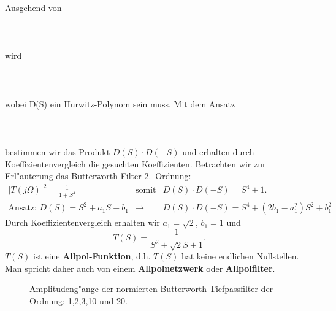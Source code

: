 \subsubsection{}
Ausgehend von\\~~\\
\\~~\\
wird\\~~\\
\\~~\\
\nit wobei D(S) ein Hurwitz-Polynom sein muss.  Mit dem Ansatz\\~~\\
\\~~\\
\nit bestimmen wir das Produkt $D(S) \cdot D(-S)$ und erhalten durch
Koeffizientenvergleich die gesuchten Koeffizienten. Betrachten wir
zur Erl"auterung das Butterworth-Filter 2.~Ordnung:
\begin{eqnarray*}
 |T(j\Omega)|^{2}=\frac{1}{1+S^{4}}&\mbox{somit ist} & D(S) \cdot D(-S)=S^{4}+1.\\
\mbox{Ansatz: } D(S)=S^{2}+a_{1}S+b_{1}  & \longrightarrow & D(S) \cdot D(-S)=S^{4}+(2b_{1}-a_{1}^{2})S^{2}+b_{1}^{2}
\end{eqnarray*}
Durch Koeffizientenvergleich erhalten wir $a_{1}=\sqrt{2}$, $b_{1}=1$
und
\[
T(S)=\frac{1}{S^{2}+\sqrt{2}S+1}.
\]
$T(S)$ ist eine {\bf Allpol-Funktion}, d.h. $T(S)$ hat keine endlichen
Nullstellen. Man spricht daher auch von einem {\bf Allpolnetzwerk}
oder {\bf Allpolfilter}.


\begin{figure}[!htb]%
\vspace*{-3mm} %
\begin{center}
\vspace*{-2mm}\caption{Amplitudeng"ange der normierten Butterworth-Tiefpassfilter der Ordnung: 1,2,3,10 und 20.}\label{fig_fil_butterworth}
\end{center}
\vspace*{-6mm}
\end{figure}

